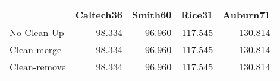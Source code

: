 \begin{tabular}{lrrrr}
\toprule
{} & Caltech36 & Smith60 &  Rice31 & Auburn71 \\
\midrule
No Clean Up  &    98.334 &  96.960 & 117.545 &  130.814 \\
Clean-merge  &    98.334 &  96.960 & 117.545 &  130.814 \\
Clean-remove &    98.334 &  96.960 & 117.545 &  130.814 \\
\bottomrule
\end{tabular}
